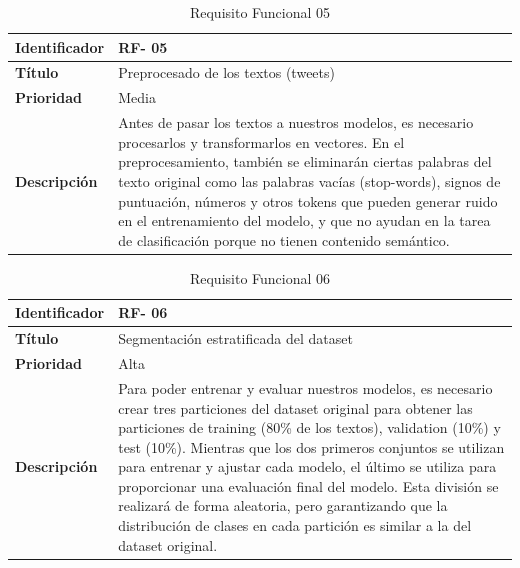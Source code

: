 \begin{table}[H] 
\begin{center}
\begin{tabular} {|P{4cm}|P{10cm}|}\hline
   {\bf Identificador} &{\bf RF- 05}\\ \hline
  \textbf{Título}& Preprocesado de los textos (tweets)\\ \hline
  \textbf{Prioridad}& Media \\ \hline
  \textbf{Descripción}& Antes de pasar los textos a nuestros modelos, es necesario procesarlos y transformarlos en vectores. En el preprocesamiento, también se eliminarán ciertas palabras del texto original como las palabras vacías (stop-words), signos de puntuación, números y otros tokens que pueden generar ruido en el entrenamiento del modelo, y que no ayudan en la tarea de clasificación porque no tienen contenido semántico. \\ \hline
\end{tabular}
\end{center}
\vspace{-0.6cm}
\caption{Requisito Funcional 05}
\end{table}

\begin{table}[H] 
\begin{center}
\begin{tabular} {|P{4cm}|P{10cm}|}\hline
   {\bf Identificador} &{\bf RF- 06}\\ \hline
  \textbf{Título}& Segmentación estratificada del dataset\\ \hline
  \textbf{Prioridad}& Alta  \\ \hline
  \textbf{Descripción}& Para poder entrenar y evaluar nuestros modelos, es necesario crear tres particiones del dataset original para obtener las particiones de training (80\% de los textos), validation (10\%) y test (10\%). Mientras que los dos primeros conjuntos se utilizan para entrenar y ajustar cada modelo, el último se utiliza para proporcionar una evaluación final del modelo. Esta división se realizará de forma aleatoria, pero garantizando que la distribución de clases en cada partición es similar a la del dataset original. \\ \hline
\end{tabular}
\end{center}
\vspace{-0.6cm}
\caption{Requisito Funcional 06}
\end{table}

